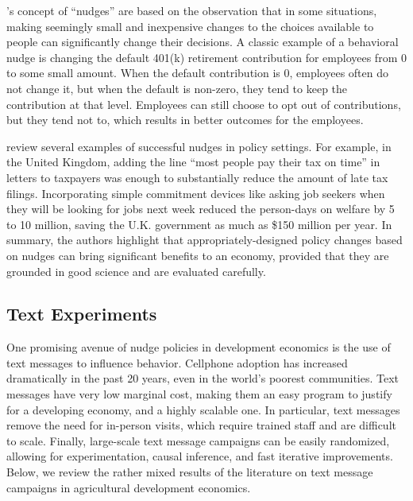 \documentclass[12pt]{article}
\begin{document}
\textcite{thaler_nudge_2009}'s concept of ``nudges'' are based on the observation that in some situations, making seemingly small and inexpensive changes to the choices available to people can significantly change their decisions. A classic example of a behavioral nudge is changing the default 401(k) retirement contribution for employees from 0 to some small amount. When the default contribution is 0, employees often do not change it, but when the default is non-zero, they tend to keep the contribution at that level. Employees can still choose to opt out of contributions, but they tend not to, which results in better outcomes for the employees.

\textcite{halpern_nudging_2016} review several examples of successful nudges in policy settings. For example, in the United Kingdom, adding the line ``most people pay their tax on time'' in letters to taxpayers was enough to substantially reduce the amount of late tax filings. Incorporating simple commitment devices like asking job seekers when they will be looking for jobs next week reduced the person-days on welfare by 5 to 10 million, saving the U.K. government as much as \$150 million per year. In summary, the authors highlight that appropriately-designed policy changes based on nudges can bring significant benefits to an economy, provided that they are grounded in good science and are evaluated carefully.

\subsection{Text Experiments}
One promising avenue of nudge policies in development economics is the use of text messages to influence behavior. Cellphone adoption has increased dramatically in the past 20 years, even in the world's poorest communities. Text messages have very low marginal cost, making them an easy program to justify for a developing economy, and a highly scalable one. In particular, text messages remove the need for in-person visits, which require trained staff and are difficult to scale. Finally, large-scale text message campaigns can be easily randomized, allowing for experimentation, causal inference, and fast iterative improvements. Below, we review the rather mixed results of the literature on text message campaigns in agricultural development economics.
\end{document}
